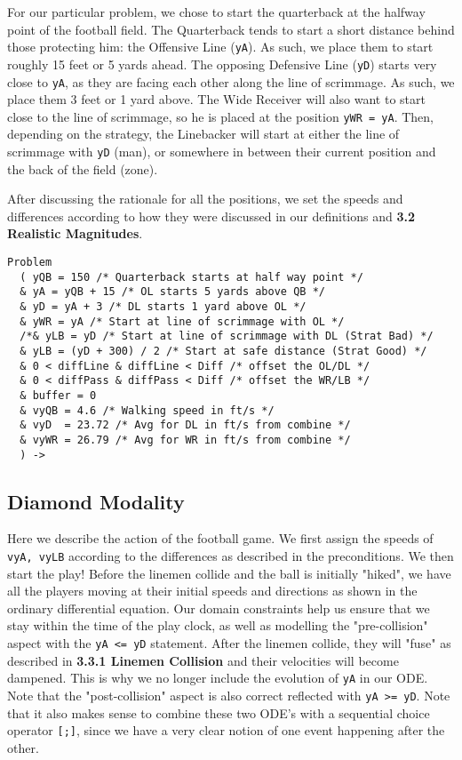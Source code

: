 \quad For our particular problem, we chose to start the quarterback at the halfway point of the football field. The Quarterback tends to start a short distance behind those protecting him: the Offensive Line (\texttt{yA}). As such, we place them to start roughly 15 feet or 5 yards ahead. The opposing Defensive Line (\texttt{yD}) starts very close to \texttt{yA}, as they are facing each other along the line of scrimmage. As such, we place them 3 feet or 1 yard above. The Wide Receiver will also want to start close to the line of scrimmage, so he is placed at the position \texttt{yWR = yA}. Then, depending on the strategy, the Linebacker will start at either the line of scrimmage with \texttt{yD} (man), or somewhere in between their current position and the back of the field (zone). 

After discussing the rationale for all the positions, we set the speeds and differences according to how they were discussed in our definitions and \textbf{3.2 Realistic Magnitudes}.

\begin{lstlisting}
Problem
  ( yQB = 150 /* Quarterback starts at half way point */
  & yA = yQB + 15 /* OL starts 5 yards above QB */
  & yD = yA + 3 /* DL starts 1 yard above OL */
  & yWR = yA /* Start at line of scrimmage with OL */
  /*& yLB = yD /* Start at line of scrimmage with DL (Strat Bad) */
  & yLB = (yD + 300) / 2 /* Start at safe distance (Strat Good) */
  & 0 < diffLine & diffLine < Diff /* offset the OL/DL */
  & 0 < diffPass & diffPass < Diff /* offset the WR/LB */
  & buffer = 0
  & vyQB = 4.6 /* Walking speed in ft/s */
  & vyD  = 23.72 /* Avg for DL in ft/s from combine */
  & vyWR = 26.79 /* Avg for WR in ft/s from combine */
  ) ->
\end{lstlisting}

\newpage 
\subsection{Diamond Modality}

\quad Here we describe the action of the football game. We first assign the speeds of \texttt{vyA, vyLB} according to the differences as described in the preconditions. We then start the play! Before the linemen collide and the ball is initially "hiked", we have all the players moving at their initial speeds and directions as shown in the ordinary differential equation. Our domain constraints help us ensure that we stay within the time of the play clock, as well as modelling the "pre-collision" aspect with the \texttt{yA <= yD} statement. After the linemen collide, they will "fuse" as described in \textbf{3.3.1 Linemen Collision} and their velocities will become dampened. This is why we no longer include the evolution of \texttt{yA} in our ODE. Note that the "post-collision" aspect is also correct reflected with \texttt{yA >= yD}. Note that it also makes sense to combine these two ODE's with a sequential choice operator \texttt{[;]}, since we have a very clear notion of one event happening after the other.

